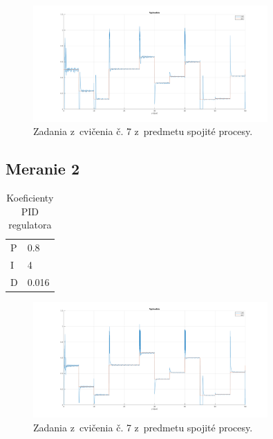 \documentclass{article}
\begin{document}
\begin{figure}[!htbp]
	\begin{center}
		\includegraphics[width=0.8\textwidth]{./include/m1.png}
	\end{center}
	\caption{Zadania z~cvičenia č. 7 z~predmetu spojité procesy.}
	\label{fig:meranie1}
\end{figure}

\subsection{Meranie 2}
\label{sec:meranie2}

\begin{table}[!htbp]
	\caption{Koeficienty PID regulatora}
	\label{tab:t2}
	\begin{center}
		\begin{tabular}[c]{|l|l|}
			\hline
			P & 0.8 \\
			I & 4 \\
			D & 0.016 \\
			\hline
		\end{tabular}
	\end{center}
\end{table}

\begin{figure}[!htbp]
	\begin{center}
		\includegraphics[width=0.8\textwidth]{./include/m2.png}
	\end{center}
	\caption{Zadania z~cvičenia č. 7 z~predmetu spojité procesy.}
	\label{fig:meranie2}
\end{figure}
\end{document}
